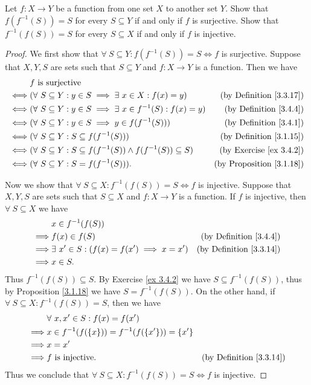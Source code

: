 \begin{exercise}\label{ex 3.4.5}
Let \(f : X \to Y\) be a function from one set \(X\) to another set \(Y\).
Show that \(f(f^{-1}(S)) = S\) for every \(S \subseteq Y\) if and only if \(f\) is surjective.
Show that \(f^{-1}(f(S)) = S\) for every \(S \subseteq X\) if and only if \(f\) is injective.
\end{exercise}

\begin{proof}
We first show that \(\forall\ S \subseteq Y : f(f^{-1}(S)) = S \iff f\) is surjective.
Suppose that \(X, Y, S\) are sets such that \(S \subseteq Y\) and \(f : X \to Y\) is a function.
Then we have
\begin{align*}
& f \text{ is surjective} \\
\iff & (\forall\ S \subseteq Y : y \in S \implies \exists\ x \in X : f(x) = y) & \text{(by Definition \ref{3.3.17})} \\
\iff & (\forall\ S \subseteq Y : y \in S \implies \exists\ x \in f^{-1}(S) : f(x) = y) & \text{(by Definition \ref{3.4.4})} \\
\iff & (\forall\ S \subseteq Y : y \in S \implies y \in f(f^{-1}(S))) & \text{(by Definition \ref{3.4.1})} \\
\iff & (\forall\ S \subseteq Y : S \subseteq f(f^{-1}(S))) & \text{(by Definition \ref{3.1.15})} \\
\iff & (\forall\ S \subseteq Y : S \subseteq f(f^{-1}(S)) \land f(f^{-1}(S)) \subseteq S) & \text{(by Exercise \ref{ex 3.4.2})} \\
\iff & (\forall\ S \subseteq Y : S = f(f^{-1}(S))). & \text{(by Proposition \ref{3.1.18})}
\end{align*}

Now we show that \(\forall\ S \subseteq X : f^{-1}(f(S)) = S \iff f\) is injective.
Suppose that \(X, Y, S\) are sets such that \(S \subseteq X\) and \(f : X \to Y\) is a function.
If \(f\) is injective, then \(\forall\ S \subseteq X\) we have
\begin{align*}
& x \in f^{-1}(f(S)) \\
\implies & f(x) \in f(S) & \text{(by Definition \ref{3.4.4})} \\
\implies & \exists\ x' \in S : (f(x) = f(x') \implies x = x') & \text{(by Definition \ref{3.3.14})} \\
\implies & x \in S.
\end{align*}
Thus \(f^{-1}(f(S)) \subseteq S\).
By Exercise \ref{ex 3.4.2} we have \(S \subseteq f^{-1}(f(S))\), thus by Proposition \ref{3.1.18} we have \(S = f^{-1}(f(S))\).
On the other hand, if \(\forall\ S \subseteq X : f^{-1}(f(S)) = S\), then we have
\begin{align*}
& \forall\ x, x' \in S : f(x) = f(x') \\
\implies & x \in f^{-1}(f(\{x\})) = f^{-1}(f(\{x'\})) = \{x'\} \\
\implies & x = x' \\
\implies & f \text{ is injective}. & \text{(by Definition \ref{3.3.14})}
\end{align*}
Thus we conclude that \(\forall\ S \subseteq X : f^{-1}(f(S)) = S \iff f\) is injective.
\end{proof}

